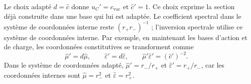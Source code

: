 Le choix adapté $d=\widehat c$ donne $u_C'=c_{\mathrm{vac}}$ et
$\widehat c'=1$. Ce choix exprime la section déjà construite dans une
base qui lui est adaptée. Le coefficient spectral dans le système de coordonnées interne reste
$(r_+r_-)^{-1}$ ; l’inversion spectrale utilise ce système de coordonnées interne.
Par exemple, en maintenant les bases d’action et de charge, les coordonnées
constitutives se transforment comme
\[
 \widehat\mu'=d\widehat\mu,
 \qquad \widehat\varepsilon'=d\widehat\varepsilon,
 \qquad
 \widehat\mu'\widehat\varepsilon'=(\widehat c')^{-2}.
\]
Dans le système de coordonnées adapté, $\widehat\mu'=r_-/r_+$ et
$\widehat\varepsilon'=r_+/r_-$, car les coordonnées internes sont
$\widehat\mu=r_-^2$ et $\widehat\varepsilon=r_+^2$.
